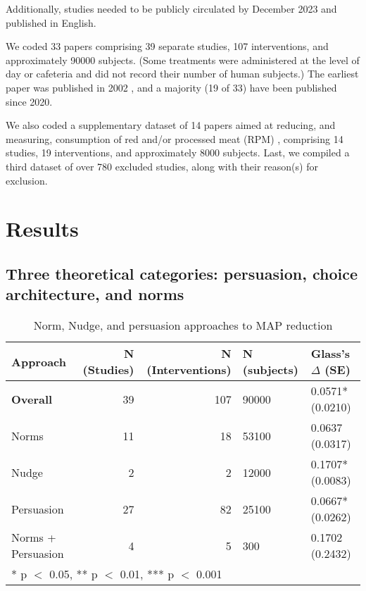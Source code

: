 \documentclass[sn-nature,pdflatex]{sn-jnl}
\begin{document}
Additionally, studies needed to be publicly circulated by December 2023
and published in English.

We coded 33 papers
\citep{aldoh2023, allen2002, alblas2023, coker2022, griesoph2021, piester2020, sparkman2017, sparkman2020, andersson2021, kanchanachitra2020, bochmann2017, bschaden2020, cooney2016, feltz2022, haile2021, mathur2021effectiveness, peacock2017, polanco2022, sparkman2021, abrahamse2007, acharya2004, berndsen2005, bertolaso2015, bianchi2022, fehrenbach2015, hatami2018, jalil2023, merrill2009, norris2014, weingarten2022, carfora2023, hennessy2016, mattson2020}
comprising 39 separate studies, 107 interventions, and approximately
90000 subjects. (Some treatments were administered at the level of day
or cafeteria and did not record their number of human subjects.) The
earliest paper was published in 2002 \citep{allen2002}, and a majority
(19 of 33) have been published since 2020.

We also coded a supplementary dataset of 14 papers aimed at reducing,
and measuring, consumption of red and/or processed meat (RPM)
\citep{carfora2017correlational, carfora2017randomised, carfora2019, carfora2019informational, delichatsios2001, dijkstra2022, emmons2005cancer, emmons2005project, jaacks2014, james2015, lee2018, perino2022, schatzkin2000, sorensen2005},
comprising 14 studies, 19 interventions, and approximately 8000
subjects. Last, we compiled a third dataset of over 780 excluded
studies, along with their reason(s) for exclusion.

\section{Results}\label{sec2}

\subsection{Three theoretical categories: persuasion, choice
architecture, and norms}\label{sec2.1}

\begin{table}[!h]
\centering
\caption{\label{tab:tab:table_one}Norm, Nudge, and persuasion approaches to MAP reduction}
\centering
\begin{tabular}[t]{lrrll}
\toprule
Approach & N (Studies) & N (Interventions) & N (subjects) & Glass's $\Delta$ (SE)\\
\midrule
\textbf{Overall} & 39 & 107 & 90000 & 0.0571* (0.0210)\\
Norms & 11 & 18 & 53100 & 0.0637 (0.0317)\\
Nudge & 2 & 2 & 12000 & 0.1707* (0.0083)\\
Persuasion & 27 & 82 & 25100 & 0.0667* (0.0262)\\
Norms + Persuasion & 4 & 5 & 300 & 0.1702 (0.2432)\\
\bottomrule
\multicolumn{5}{l}{\rule{0pt}{1em}* p $<$ 0.05, ** p $<$ 0.01, *** p $<$ 0.001}\\
\end{tabular}
\end{table}
\end{document}
